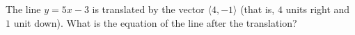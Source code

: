 The line $y=5x-3$ is translated by the vector $\langle4,-1\rangle$ (that is, $4$ units right and $1$ unit down). What is the equation of the line after the translation?
